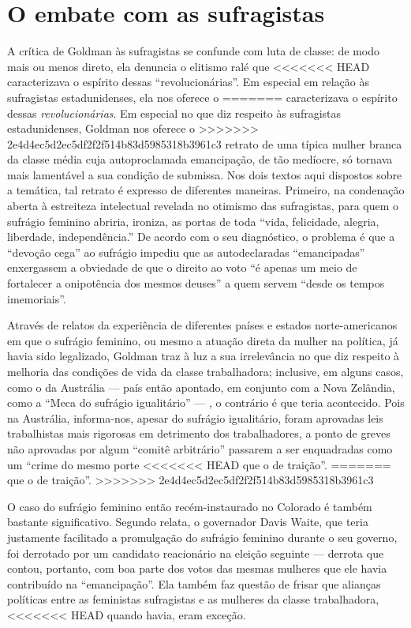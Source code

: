 \section{O embate com as sufragistas}

A crítica de Goldman às sufragistas se confunde com luta de classe: de
modo mais ou menos direto, ela denuncia o elitismo ralé que
<<<<<<< HEAD
caracterizava o espírito dessas ``revolucionárias''. Em especial
em relação às sufragistas estadunidenses, ela nos oferece o
=======
caracterizava o espírito dessas \textit{revolucionárias}. Em especial no que
diz respeito às sufragistas estadunidenses, Goldman nos oferece o
>>>>>>> 2e4d4ec5d2ec5df2f2f514b83d5985318b3961c3
retrato de uma típica mulher branca da classe média cuja autoproclamada
emancipação, de tão medíocre, só tornava mais lamentável a sua condição
de submissa. Nos dois textos aqui dispostos sobre a temática, tal
retrato é expresso de diferentes maneiras. Primeiro, na condenação
aberta à estreiteza intelectual revelada no otimismo das sufragistas,
para quem o sufrágio feminino abriria, ironiza, as portas de toda
``vida, felicidade, alegria, liberdade, independência.'' De acordo com o
seu diagnóstico, o problema é que a ``devoção cega'' ao sufrágio impediu
que as autodeclaradas ``emancipadas'' enxergassem a obviedade de que o
direito ao voto ``é apenas um meio de fortalecer a onipotência dos
mesmos deuses'' a quem servem ``desde os tempos imemoriais''.

Através de relatos da experiência de diferentes países e estados
norte-americanos em que o sufrágio feminino, ou mesmo a atuação direta
da mulher na política, já havia sido legalizado, Goldman traz à luz a
sua irrelevância no que diz respeito à melhoria das condições de vida da
classe trabalhadora; inclusive, em alguns casos, como o da Austrália ---
país então apontado, em conjunto com a Nova Zelândia, como a ``Meca do
sufrágio igualitário'' --- , o contrário é que teria acontecido. Pois na
Austrália, informa-nos, apesar do sufrágio igualitário, foram
aprovadas leis trabalhistas mais rigorosas em detrimento dos
trabalhadores, a ponto de greves não aprovadas por algum ``comitê
arbitrário'' passarem a ser enquadradas como um ``crime do mesmo porte
<<<<<<< HEAD
que o de traição''.
=======
que o de traição''. 
>>>>>>> 2e4d4ec5d2ec5df2f2f514b83d5985318b3961c3

O caso do sufrágio feminino então recém-instaurado
no Colorado é também bastante significativo. Segundo relata, o
governador Davis Waite, que teria justamente facilitado a promulgação do
sufrágio feminino durante o seu governo, foi derrotado por um candidato
reacionário na eleição seguinte --- derrota que contou, portanto, com boa
parte dos votos das mesmas mulheres que ele havia contribuído na
``emancipação''. Ela também faz questão de frisar que alianças políticas
entre as feministas sufragistas e as mulheres da classe trabalhadora,
<<<<<<< HEAD
quando havia, eram exceção.

